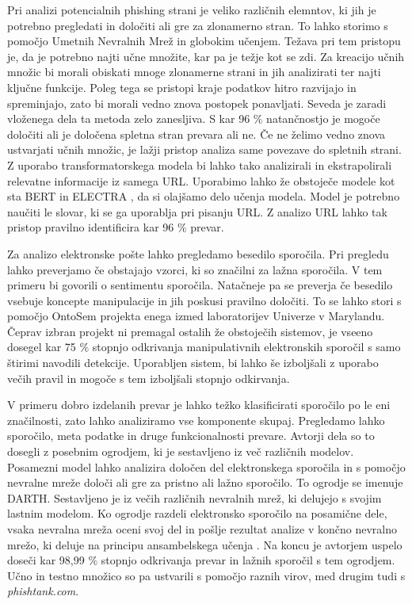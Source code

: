\documentclass[sigconf,nonacm]{acmart}
\begin{document}
Pri analizi potencialnih phishing \cite{rekouche2011early} strani je veliko različnih elemntov, ki jih je potrebno pregledati in določiti ali gre za zlonamerno stran. To lahko storimo s pomočjo Umetnih Nevralnih Mrež in globokim učenjem. Težava pri tem pristopu je, da je potrebno najti učne množite, kar pa je težje kot se zdi. Za kreacijo učnih množic bi morali obiskati mnoge zlonamerne strani in jih analizirati ter najti ključne funkcije. Poleg tega se pristopi kraje podatkov hitro razvijajo in spreminjajo, zato bi morali vedno znova postopek ponavljati. Seveda je zaradi vloženega dela ta metoda zelo zanesljiva. S kar 96 \% natančnostjo je mogoče določiti ali je določena spletna stran prevara ali ne.  Če ne želimo vedno znova ustvarjati učnih množic, je lažji pristop analiza same povezave do spletnih strani. Z uporabo transformatorskega modela bi lahko tako analizirali in ekstrapolirali relevatne informacije iz samega URL. Uporabimo lahko že obstoječe modele kot sta BERT \cite{devlin2018bert} in ELECTRA \cite{clark2020electra}, da si olajšamo delo učenja modela. Model je potrebno naučiti le slovar, ki se ga uporablja pri pisanju URL. Z analizo URL lahko tak pristop pravilno identificira kar 96 \% prevar. \cite{HAYNES2021127}

Za analizo elektronske pošte lahko pregledamo besedilo sporočila. Pri pregledu lahko preverjamo če obstajajo vzorci, ki so značilni za lažna sporočila. V tem primeru bi govorili o sentimentu sporočila. Natačneje pa se preverja če besedilo vsebuje koncepte manipulacije in jih poskusi pravilno določiti. To se lahko stori s pomočjo OntoSem projekta enega izmed laboratorijev Univerze v Marylandu. Čeprav izbran projekt ni premagal ostalih že obstoječih sistemov, je vseeno dosegel kar 75 \% stopnjo odkrivanja manipulativnih elektronskih sporočil s samo štirimi navodili detekcije. Uporabljen sistem, bi lahko še izboljšali z uporabo večih pravil in mogoče s tem izboljšali stopnjo odkirvanja. \cite{stone2007ebids}

V primeru dobro izdelanih prevar je lahko težko klasificirati sporočilo po le eni značilnosti, zato lahko analiziramo vse komponente skupaj. Pregledamo lahko sporočilo, meta podatke in druge funkcionalnosti prevare. Avtorji dela \cite{mittal2022phishing} so to dosegli z posebnim ogrodjem, ki je sestavljeno iz več različnih modelov. Posamezni model lahko analizira določen del elektronskega sporočila in s pomočjo nevralne mreže določi ali gre za pristno ali lažno sporočilo. To ogrodje se imenuje DARTH. Sestavljeno je iz večih različnih nevralnih mrež, ki delujejo s svojim lastnim modelom. Ko ogrodje razdeli elektronsko sporočilo na posamične dele, vsaka nevralna mreža oceni svoj del in pošlje rezultat analize v končno nevralno mrežo, ki deluje na principu ansambelskega učenja \cite{682375}. Na koncu je avtorjem uspelo doseči kar 98,99 \% stopnjo odkrivanja prevar in lažnih sporočil s tem ogrodjem. Učno in testno množico so pa ustvarili s pomočjo raznih virov, med drugim tudi s \emph{phishtank.com}.
\end{document}
